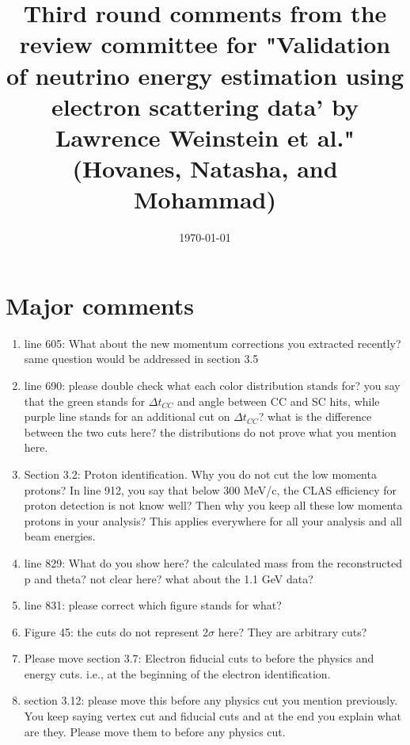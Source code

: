 \documentclass[a4paper,11pt,twoside]{article}
\title{Third round comments from the review committee for "Validation of 
neutrino energy estimation using electron scattering data' by Lawrence 
Weinstein et al." \\
 (Hovanes, Natasha, and Mohammad)}
\date{\today}
\begin{document}
\maketitle

\section{Major comments}

\begin{enumerate}
   \item line 605: What about the new momentum corrections you extracted 
      recently? same question would be addressed in section 3.5 

   \item line 690: please double check what each color distribution stands for?  
      you say that the green stands for $\Delta t_{CC}$ and angle between CC 
      and SC hits, while purple line stands for an additional cut on $\Delta 
      t_{CC}$? what is the difference between the two cuts here? the 
      distributions do not prove what you mention here.  

   \item Section 3.2: Proton identification. Why you do not cut the low momenta 
      protons? In line 912, you say that below 300 MeV/c, the CLAS efficiency 
      for proton detection is not know well? Then why you keep all these low 
      momenta protons in your analysis? This applies everywhere for all your 
      analysis and all beam energies.

   \item line 829: What do you show here? the calculated mass from the 
      reconstructed p and theta? not clear here? what about the 1.1 GeV data?

   \item line 831: please correct which figure stands for what?

   \item Figure 45: the cuts do not represent 2$\sigma$ here? They are 
      arbitrary cuts?

   \item Please move section 3.7: Electron fiducial cuts to before the physics 
      and energy cuts. i.e., at the beginning of the electron identification.

   \item section 3.12: please move this before any physics cut you mention 
      previously. You keep saying vertex cut and fiducial cuts and at the end 
      you explain what are they. Please move them to before any physics cut.   

\end{enumerate}
\end{document}
